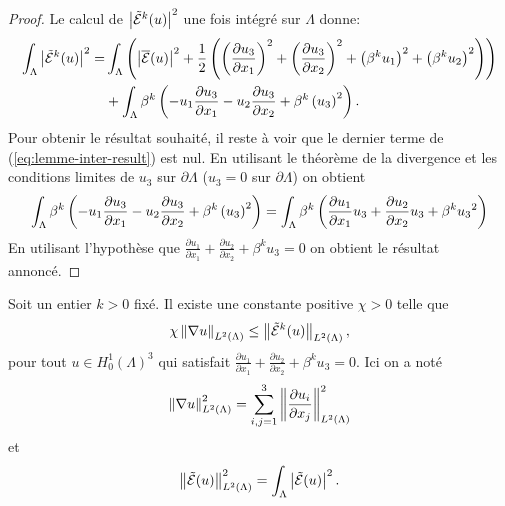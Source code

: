 \begin{proof}
  Le calcul de $\left\lvert \tilde{\mathcal E}^k(u) \right\rvert^2$ une fois
  intégré sur $\Lambda$ donne:
  \begin{align}
    \int_\Lambda \left\lvert \tilde{\mathcal E}^k(u) \right\rvert^2 =
    &\int_\Lambda \left( \left\lvert \overline{\mathcal E}(u) \right\rvert^2
    + \frac{1}{2}\left( 
      \left( \frac{\partial u_3}{\partial x_1} \right)^2
      + \left( \frac{\partial u_3}{\partial x_2} \right)^2
      + \left( \beta^k u_1 \right)^2
      + \left( \beta^k u_2 \right)^2 \right) \right)\nonumber\\
    &+ \int_\Lambda \beta^k\left( 
      - u_1 \frac{\partial u_3}{\partial x_1}
      - u_2 \frac{\partial u_3}{\partial x_2}
      + \beta^k\left( u_3 \right)^2
     \right).\label{eq:lemme-inter-result}
  \end{align}
  Pour obtenir le résultat souhaité, il reste à voir que le
  dernier terme de (\ref{eq:lemme-inter-result}) est nul.
  En utilisant le théorème de la divergence et les conditions limites
  de $u_3$ sur $\partial \Lambda$ ($u_3 = 0$ sur $\partial \Lambda$) on obtient
  \begin{align}
    \int_\Lambda \beta^k\left( 
      - u_1 \frac{\partial u_3}{\partial x_1}
      - u_2 \frac{\partial u_3}{\partial x_2}
      + \beta^k\left( u_3 \right)^2 \right) =
    \int_\Lambda\beta^k\left( 
        \frac{\partial u_1}{\partial x_1}u_3
      + \frac{\partial u_2}{\partial x_2}u_3 +
      \beta^k{u_3}^2 \right)\label{eq:lemme-nul-term}
  \end{align}
  En utilisant l'hypothèse que $\frac{\partial u_1}{\partial x_1} +
  \frac{\partial u_2}{\partial x_2} + \beta^k u_3 = 0$ on obtient le
  résultat annoncé.
\end{proof}

\begin{lemme}\label{lem:2}
  Soit un entier $k > 0$ fixé. Il existe une constante positive $\chi >
  0$ telle que
  \begin{equation}
\chi \left\lVert \nabla u \right\rVert_{L^2(\Lambda)} \leq
\left\lVert \tilde{\mathcal E}^k(u) \right\rVert_{L^2(\Lambda)},
  \end{equation}
  pour tout $u \in H^1_0(\Lambda)^3$ qui satisfait $\frac{\partial
    u_1}{\partial x_1} + \frac{\partial u_2}{\partial x_2} +
  \beta^k u_3 = 0$. Ici on a noté
  \begin{equation}
    \left\lVert \nabla u \right\rVert_{L^2(\Lambda)}^2 = \sum_{i,j = 1}^3 \left\lVert \frac{\partial u_i}{\partial x_j} \right\rVert^2_{L^2(\Lambda)}
  \end{equation}
  et
  \begin{equation}
    \left\lVert \tilde{\mathcal E}(u) \right\rVert^2_{L^2(\Lambda)} = \int_\Lambda \left\lvert \tilde{\mathcal E}(u) \right\rvert^2.
  \end{equation}
\end{lemme}

